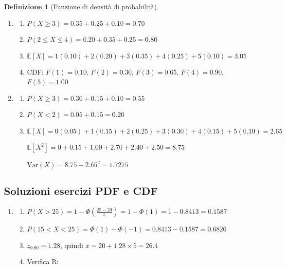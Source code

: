 \documentclass[
  italian,
  letterpaper,
  a4paper,
  11pt,
  open=any]{scrbook}
\theoremstyle{plain}
\theoremstyle{definition}
\theoremstyle{definition}
\newtheorem{definition}{Definizione}[chapter]
\theoremstyle{remark}
\begin{document}
\begin{definition}[Funzione di densità di
probabilità]
\begin{tcolorbox}
\begin{enumerate}
\def\labelenumi{\arabic{enumi}.}
\setcounter{enumi}{3}
\item
  \begin{enumerate}
  \def\labelenumii{\alph{enumii}.}
  \item
    \(P(X \geq 3) = 0.35 + 0.25 + 0.10 = 0.70\)
  \item
    \(P(2 \leq X \leq 4) = 0.20 + 0.35 + 0.25 = 0.80\)
  \item
    \(\mathbb{E}[X] = 1(0.10) + 2(0.20) + 3(0.35) + 4(0.25) + 5(0.10) = 3.05\)
  \item
    CDF: \(F(1) = 0.10\), \(F(2) = 0.30\), \(F(3) = 0.65\),
    \(F(4) = 0.90\), \(F(5) = 1.00\)
  \end{enumerate}
\item
  \begin{enumerate}
  \def\labelenumii{\alph{enumii}.}
  \item
    \(P(X \geq 3) = 0.30 + 0.15 + 0.10 = 0.55\)
  \item
    \(P(X < 2) = 0.05 + 0.15 = 0.20\)
  \item
    \(\mathbb{E}[X] = 0(0.05) + 1(0.15) + 2(0.25) + 3(0.30) + 4(0.15) + 5(0.10) = 2.65\)

    \(\mathbb{E}[X^2] = 0 + 0.15 + 1.00 + 2.70 + 2.40 + 2.50 = 8.75\)

    \(\text{Var}(X) = 8.75 - 2.65^2 = 1.7275\)
  \end{enumerate}
\end{enumerate}

\subsection*{Soluzioni esercizi PDF e
CDF}\label{soluzioni-esercizi-pdf-e-cdf}

\begin{enumerate}
\def\labelenumi{\arabic{enumi}.}
\setcounter{enumi}{5}
\item
  \begin{enumerate}
  \def\labelenumii{\alph{enumii}.}
  \item
    \(P(X > 25) = 1 - \Phi\left(\frac{25-20}{5}\right) = 1 - \Phi(1) = 1 - 0.8413 = 0.1587\)
  \item
    \(P(15 < X < 25) = \Phi(1) - \Phi(-1) = 0.8413 - 0.1587 = 0.6826\)
  \item
    \(z_{0.90} = 1.28\), quindi \(x = 20 + 1.28 \times 5 = 26.4\)
  \item
    Verifica R:
  \end{enumerate}


\end{enumerate}
\end{tcolorbox}
\end{definition}
\end{document}
